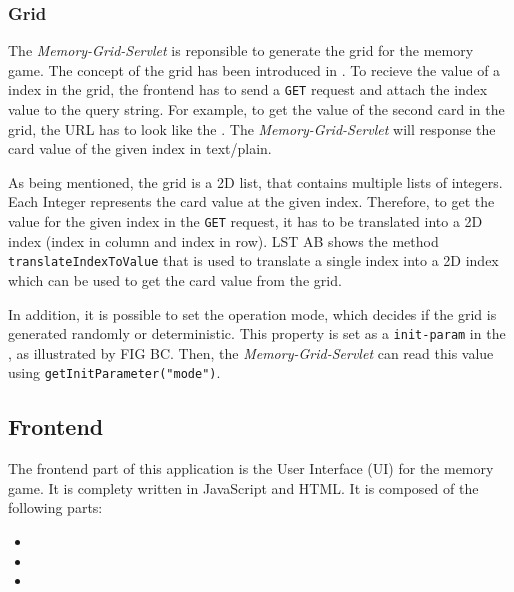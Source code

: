 \subsubsection{Grid}\label{subsubsec:03_impl_backend_grid}
The \textit{Memory-Grid-Servlet} is reponsible to generate the grid for the memory game. The concept of the grid has been introduced in .
To recieve the value of a index in the grid, the frontend has to send a \texttt{GET} request and attach the index value to the query string. For example, to get the value of the second card in the grid, the URL has to look like the .
The \textit{Memory-Grid-Servlet} will response the card value of the given index in text/plain.

As being mentioned, the grid is a 2D list, that contains multiple lists of integers. Each Integer represents the card value at the given index. Therefore, to get the value for the given index in the \texttt{GET} request, it has to be translated into a 2D index (index in column and index in row). LST AB shows the method \texttt{translateIndexToValue} that is used to translate a single index into a 2D index which can be used to get the card value from the grid.

In addition, it is possible to set the operation mode, which decides if the grid is generated randomly or deterministic. This property is set as a \texttt{init-param} in the , as illustrated by FIG BC. Then, the \textit{Memory-Grid-Servlet} can read this value using \texttt{getInitParameter("mode")}.


\subsection{Frontend}\label{subsec:03_impl_frontend}
The frontend part of this application is the User Interface (UI) for the memory game. It is complety written in JavaScript and HTML.
%
It is composed of the following parts:
\begin{itemize}
\item {}
\item {}
\item {}
\end{itemize}

